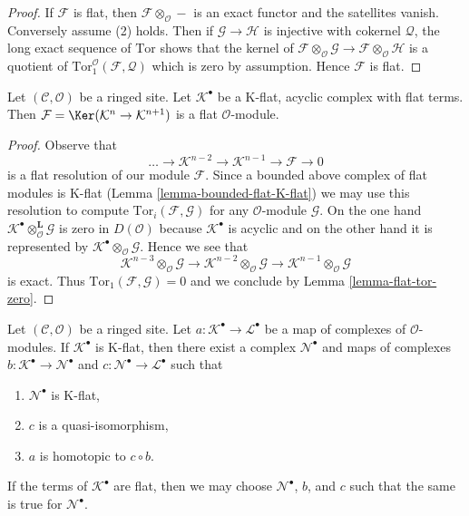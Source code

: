 \begin{proof}
If $\mathcal{F}$ is flat, then $\mathcal{F} \otimes_\mathcal{O} -$
is an exact functor and the satellites vanish. Conversely assume (2)
holds. Then if $\mathcal{G} \to \mathcal{H}$ is injective with cokernel
$\mathcal{Q}$, the long exact sequence of $\text{Tor}$ shows that
the kernel of
$\mathcal{F} \otimes_\mathcal{O} \mathcal{G} \to
\mathcal{F} \otimes_\mathcal{O} \mathcal{H}$
is a quotient of
$\text{Tor}_1^\mathcal{O}(\mathcal{F}, \mathcal{Q})$
which is zero by assumption. Hence $\mathcal{F}$ is flat.
\end{proof}

\begin{lemma}
\label{lemma-K-flat-flat-acyclic}
Let $(\mathcal{C}, \mathcal{O})$ be a ringed site. Let $\mathcal{K}^\bullet$
be a K-flat, acyclic complex with flat terms. Then
$\mathcal{F} = \Ker(\mathcal{K}^n \to \mathcal{K}^{n + 1})$
is a flat $\mathcal{O}$-module.
\end{lemma}

\begin{proof}
Observe that
$$
\ldots \to \mathcal{K}^{n - 2} \to \mathcal{K}^{n - 1} \to
\mathcal{F} \to 0
$$
is a flat resolution of our module $\mathcal{F}$. Since a bounded above complex
of flat modules is K-flat (Lemma \ref{lemma-bounded-flat-K-flat})
we may use this resolution to compute
$\text{Tor}_i(\mathcal{F}, \mathcal{G})$ for any
$\mathcal{O}$-module $\mathcal{G}$. On the one hand
$\mathcal{K}^\bullet \otimes_\mathcal{O}^\mathbf{L} \mathcal{G}$
is zero in $D(\mathcal{O})$ because $\mathcal{K}^\bullet$ is acyclic
and on the other hand it is represented by
$\mathcal{K}^\bullet \otimes_\mathcal{O} \mathcal{G}$.
Hence we see that
$$
\mathcal{K}^{n - 3} \otimes_\mathcal{O} \mathcal{G} \to
\mathcal{K}^{n - 2} \otimes_\mathcal{O} \mathcal{G} \to
\mathcal{K}^{n - 1} \otimes_\mathcal{O} \mathcal{G}
$$
is exact. Thus $\text{Tor}_1(\mathcal{F}, \mathcal{G}) = 0$
and we conclude by Lemma \ref{lemma-flat-tor-zero}.
\end{proof}

\begin{lemma}
\label{lemma-factor-through-K-flat}
Let $(\mathcal{C}, \mathcal{O})$ be a ringed site.
Let $a : \mathcal{K}^\bullet \to \mathcal{L}^\bullet$ be a map of complexes
of $\mathcal{O}$-modules. If $\mathcal{K}^\bullet$ is K-flat, then
there exist a complex $\mathcal{N}^\bullet$ and maps of complexes
$b : \mathcal{K}^\bullet \to \mathcal{N}^\bullet$
and $c : \mathcal{N}^\bullet \to \mathcal{L}^\bullet$ such that
\begin{enumerate}
\item $\mathcal{N}^\bullet$ is K-flat,
\item $c$ is a quasi-isomorphism,
\item $a$ is homotopic to $c \circ b$.
\end{enumerate}
If the terms of $\mathcal{K}^\bullet$ are flat, then we may choose
$\mathcal{N}^\bullet$, $b$, and $c$
such that the same is true for $\mathcal{N}^\bullet$.
\end{lemma}


